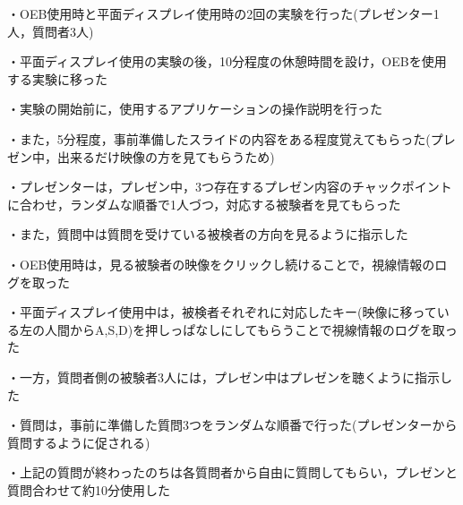 ・OEB使用時と平面ディスプレイ使用時の2回の実験を行った(プレゼンター1人，質問者3人)

・平面ディスプレイ使用の実験の後，10分程度の休憩時間を設け，OEBを使用する実験に移った

・実験の開始前に，使用するアプリケーションの操作説明を行った

・また，5分程度，事前準備したスライドの内容をある程度覚えてもらった(プレゼン中，出来るだけ映像の方を見てもらうため)

・プレゼンターは，プレゼン中，3つ存在するプレゼン内容のチャックポイントに合わせ，ランダムな順番で1人づつ，対応する被験者を見てもらった

・また，質問中は質問を受けている被検者の方向を見るように指示した

・OEB使用時は，見る被験者の映像をクリックし続けることで，視線情報のログを取った

・平面ディスプレイ使用中は，被検者それぞれに対応したキー(映像に移っている左の人間からA,S,D)を押しっぱなしにしてもらうことで視線情報のログを取った

・一方，質問者側の被験者3人には，プレゼン中はプレゼンを聴くように指示した

・質問は，事前に準備した質問3つをランダムな順番で行った(プレゼンターから質問するように促される)

・上記の質問が終わったのちは各質問者から自由に質問してもらい，プレゼンと質問合わせて約10分使用した
